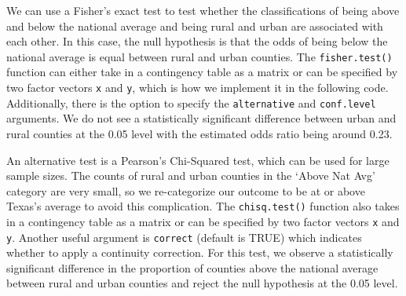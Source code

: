\documentclass[
  letterpaper,
]{latex/krantz}
\makeatletter
\newenvironment{Shaded}{\begin{snugshade}}{\end{snugshade}}
\newcommand{\CommentTok}[1]{\textcolor[rgb]{0.37,0.37,0.37}{#1}}
\newcommand{\FunctionTok}[1]{\textcolor[rgb]{0.28,0.35,0.67}{#1}}
\newcommand{\NormalTok}[1]{\textcolor[rgb]{0.00,0.23,0.31}{#1}}
\newcommand{\OtherTok}[1]{\textcolor[rgb]{0.00,0.23,0.31}{#1}}
\newcommand{\SpecialCharTok}[1]{\textcolor[rgb]{0.37,0.37,0.37}{#1}}
\newenvironment{kframe}{%
\medskip{}
\setlength{\fboxsep}{.8em}
 \def\at@end@of@kframe{}%
 \ifinner\ifhmode%
  \def\at@end@of@kframe{\end{minipage}}%
  \begin{minipage}{\columnwidth}%
 \fi\fi%
 \def\FrameCommand##1{\hskip\@totalleftmargin \hskip-\fboxsep
 \colorbox{shadecolor}{##1}\hskip-\fboxsep
     \hskip-\linewidth \hskip-\@totalleftmargin \hskip\columnwidth}%
 \MakeFramed {\advance\hsize-\width
   \@totalleftmargin\z@ \linewidth\hsize
   \@setminipage}}%
 {\par\unskip\endMakeFramed%
 \at@end@of@kframe}
\renewenvironment{Shaded}{\begin{kframe}}{\end{kframe}}
\makeatother
\begin{document}
We can use a Fisher's exact test to test whether the classifications of
being above and below the national average and being rural and urban are
associated with each other. In this case, the null hypothesis is that
the odds of being below the national average is equal between rural and
urban counties. The
\texttt{fisher.test()}
function can either take in a contingency table as a matrix or can be
specified by two factor vectors \texttt{x} and \texttt{y}, which is how
we implement it in the following code. Additionally, there is the option
to specify the \texttt{alternative} and \texttt{conf.level} arguments.
We do not see a statistically significant difference between urban and
rural counties at the 0.05 level with the estimated odds ratio being
around 0.23.

\begin{Shaded}
\end{Shaded}

An alternative test is a Pearson's Chi-Squared test, which can be used
for large sample sizes. The counts of rural and urban counties in the
`Above Nat Avg' category are very small, so we re-categorize our outcome
to be at or above Texas's average to avoid this complication. The
\texttt{chisq.test()}
function also takes in a contingency table as a matrix or can be
specified by two factor vectors \texttt{x} and \texttt{y}. Another
useful argument is \texttt{correct} (default is TRUE) which indicates
whether to apply a continuity correction. For this test, we observe a
statistically significant difference in the proportion of counties above
the national average between rural and urban counties and reject the
null hypothesis at the 0.05 level.
\end{document}
